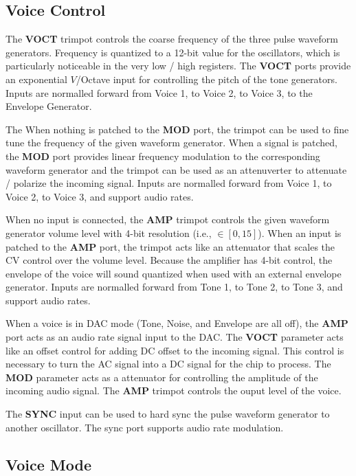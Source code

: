 \documentclass[12pt,letter]{article}
\begin{document}
\subsection{Voice Control}

The \textbf{VOCT} trimpot controls the coarse frequency of the three pulse waveform generators. Frequency is quantized to a 12-bit value for the oscillators, which is particularly noticeable in the very low / high registers. The \textbf{VOCT} ports provide an exponential $V$/Octave input for controlling the pitch of the tone generators. Inputs are normalled forward from Voice 1, to Voice 2, to Voice 3, to the Envelope Generator.

The When nothing is patched to the \textbf{MOD} port, the trimpot can be used to fine tune the frequency of the given waveform generator. When a signal is patched, the \textbf{MOD} port provides linear frequency modulation to the corresponding waveform generator and the trimpot can be used as an attenuverter to attenuate / polarize the incoming signal. Inputs are normalled forward from Voice 1, to Voice 2, to Voice 3, and support audio rates.

When no input is connected, the \textbf{AMP} trimpot controls the given waveform generator volume level with 4-bit resolution (i.e., $\in [0, 15]$). When an input is patched to the \textbf{AMP} port, the trimpot acts like an attenuator that scales the CV control over the volume level. Because the amplifier has 4-bit control, the envelope of the voice will sound quantized when used with an external envelope generator. Inputs are normalled forward from Tone 1, to Tone 2, to Tone 3, and support audio rates.

When a voice is in DAC mode (Tone, Noise, and Envelope are all off), the \textbf{AMP} port acts as an audio rate signal input to the DAC. The \textbf{VOCT} parameter acts like an offset control for adding DC offset to the incoming signal. This control is necessary to turn the AC signal into a DC signal for the chip to process. The \textbf{MOD} parameter acts as a attenuator for controlling the amplitude of the incoming audio signal. The \textbf{AMP} trimpot controls the ouput level of the voice.

The \textbf{SYNC} input can be used to hard sync the pulse waveform generator to another oscillator. The sync port supports audio rate modulation.

\subsection{Voice Mode}
\end{document}
